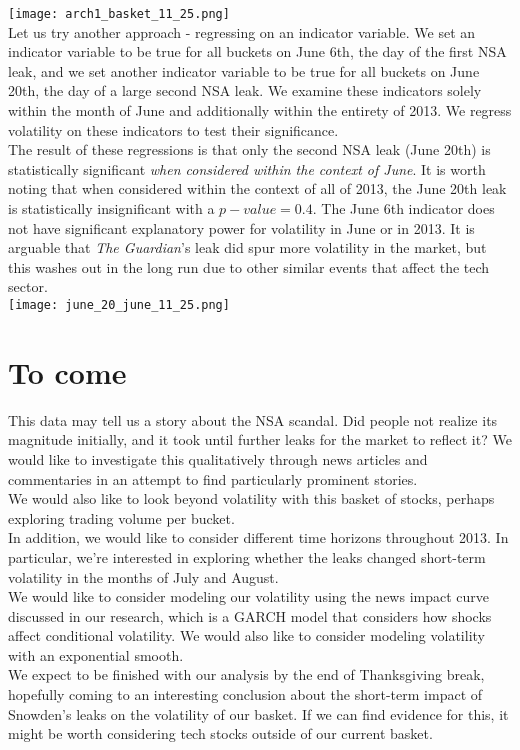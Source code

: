 \documentclass[11pt]{amsart}
\begin{document}
\texttt{[image: arch1\_basket\_11\_25.png]} \\

\newpage
Let us try another approach - regressing on an indicator variable. We set an indicator variable to be true for all buckets on June 6th, the day of the first NSA leak, and we set another indicator variable to be true for all buckets on June 20th, the day of a large second NSA leak. We examine these indicators solely within the month of June and additionally within the entirety of 2013. We regress volatility on these indicators to test their significance. \\

The result of these regressions is that only the second NSA leak (June 20th) is statistically significant \textit{when considered within the context of June}. It is worth noting that when considered within the context of all of 2013, the June 20th leak is statistically insignificant with a  $p-value = 0.4$. The June 6th indicator does not have significant explanatory power for volatility in June or in 2013. It is arguable that \textit{The Guardian}'s leak did spur more volatility in the market, but this washes out in the long run due to other similar events that affect the tech sector. \\

\texttt{[image: june\_20\_june\_11\_25.png]} \\

\newpage
\section{To come}
This data may tell us a story about the NSA scandal. Did people not realize its magnitude initially, and it took until further leaks for the market to reflect it? We would like to investigate this qualitatively through news articles and commentaries in an attempt to find particularly prominent stories. \\

We would also like to look beyond volatility with this basket of stocks, perhaps exploring trading volume per bucket. \\

In addition, we would like to consider different time horizons throughout 2013. In particular, we're interested in exploring whether the leaks changed short-term volatility in the months of July and August. \\

We would like to consider modeling our volatility using the news impact curve discussed in our research, which is a GARCH model that considers how shocks affect conditional volatility. We would also like to consider modeling volatility with an exponential smooth. \\

We expect to be finished with our analysis by the end of Thanksgiving break, hopefully coming to an interesting conclusion about the short-term impact of Snowden's leaks on the volatility of our basket. If we can find evidence for this, it might be worth considering tech stocks outside of our current basket. \\
\end{document}
